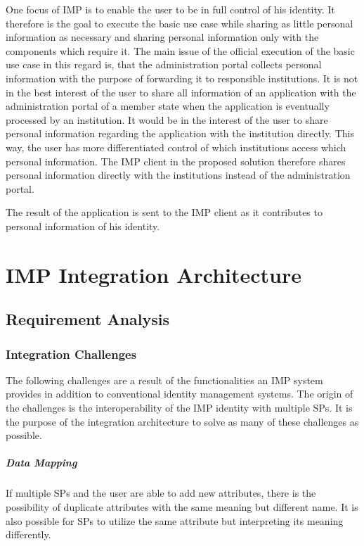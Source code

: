 \documentclass[
     12pt,         %
     a4paper,      %
     BCOR=10mm,version=first,     %
     DIV=14,version=first,        %
     ]{scrreprt}
\begin{document}
One focus of IMP is to enable the user to be in full control of his identity. It therefore is the goal to execute the basic use case while sharing as little personal information as necessary and sharing personal information only with the components which require it. The main issue of the official execution of the basic use case in this regard is, that the administration portal collects personal information with the purpose of forwarding it to responsible institutions. It is not in the best interest of the user to share all information of an application with the administration portal of a member state when the application is eventually processed by an institution. It would be in the interest of the user to share personal information regarding the application with the institution directly. This way, the user has more differentiated control of which institutions access which personal information. The IMP client in the proposed solution therefore shares personal information directly with the institutions instead of the administration portal.

The result of the application is sent to the IMP client as it contributes to personal information of his identity.

\chapter{IMP Integration Architecture}

\section{Requirement Analysis}

\subsection{Integration Challenges}

The following challenges are a result of the functionalities an IMP system provides in addition to conventional identity management systems. The origin of the challenges is the interoperability of the IMP identity with multiple SPs. It is the purpose of the integration architecture to solve as many of these challenges as possible.

\paragraph{Data Mapping}
If multiple SPs and the user are able to add new attributes, there is the possibility of duplicate attributes with the same meaning but different name. It is also possible for SPs to utilize the same attribute but interpreting its meaning differently.
\end{document}
